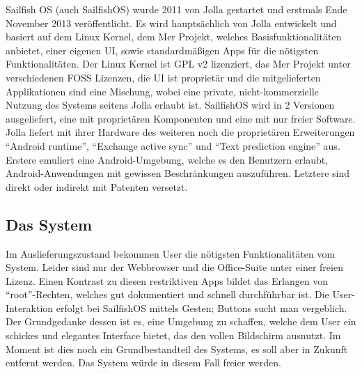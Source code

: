 Sailfish OS (auch \mbox{SailfishOS}) wurde 2011 von Jolla gestartet und erstmals Ende November 2013\thinspace\cite{online:jolla-about} veröffentlicht. Es wird hauptsächlich von Jolla entwickelt und basiert auf dem Linux Kernel, dem Mer Projekt, welches Basisfunktionalitäten anbietet, einer eigenen UI, sowie standardmäßigen Apps für die nötigsten Funktionalitäten\thinspace\cite{online:sailfish-about}. Der Linux Kernel ist GPL v2 lizenziert\thinspace\cite{online:kernel-license}, das Mer Projekt unter verschiedenen FOSS Lizenzen\thinspace\cite{online:mer-license}, die UI ist proprietär und die mitgelieferten Applikationen sind eine Mischung\thinspace\cite{online:sailfish-about}, wobei eine private, \mbox{nicht-kommerzielle} Nutzung des Systems seitens Jolla erlaubt ist\thinspace\cite{online:sailfish-eula}. \mbox{SailfishOS} wird in 2 Versionen ausgeliefert, eine mit proprietären Komponenten und eine mit nur freier Software. Jolla liefert mit ihrer Hardware des weiteren noch die proprietären Erweiterungen\thinspace\cite{online:sailfish-about} ``Android runtime''\thinspace\cite{online:sailfish-android-runtime-licensor}, ``Exchange active sync''\thinspace\cite{online:microsoft-eas} und ``Text prediction engine''\thinspace\cite{online:jolla-xt9}\thinspace\cite{online:xt9-license} aus. Erstere emuliert eine \mbox{Android-Umgebung}, welche es den Benutzern erlaubt, Android-Anwendungen mit gewissen Beschränkungen auszuführen\thinspace\cite{online:sailfish-android-runtime}. Letztere sind direkt oder indirekt mit Patenten versetzt.
\newline

\subsection{Das System}
Im Auslieferungszustand bekommen User die nötigsten Funktionalitäten vom System. Leider sind nur der Webbrowser und die \mbox{Office-Suite} unter einer freien Lizenz\thinspace\cite{online:sailfish-about}. Einen Kontrast zu diesen restriktiven Apps bildet das Erlangen von \mbox{``root''-Rechten}, welches gut dokumentiert und schnell durchführbar ist\thinspace\cite{online:sailfish-root}. Die User-Interaktion erfolgt bei \mbox{SailfishOS} mittels Gesten; Buttons sucht man vergeblich. Der Grundgedanke dessen ist es, eine Umgebung zu schaffen, welche dem User ein schickes und elegantes Interface bietet, das den vollen Bildschirm ausnutzt\thinspace\cite{online:sailfish-ui}. Im Moment ist dies noch ein Grundbestandteil des Systems, es soll aber in Zukunft entfernt werden\thinspace\cite{online:sailfish-about}. Das System würde in diesem Fall freier werden.

